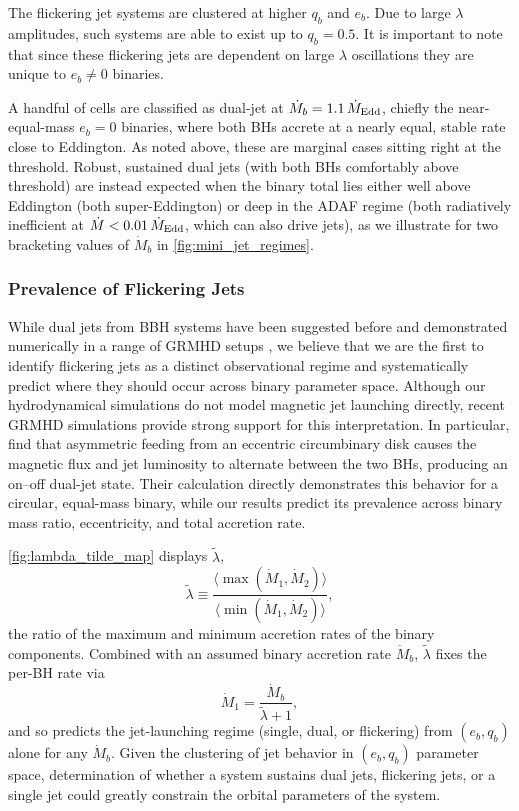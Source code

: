 \documentclass[fleqn,usenatbib]{mnras}
\begin{document}
The flickering jet systems are clustered at higher $q_b$ and $e_b$. Due to large $\lambda$ amplitudes, such systems are able to exist up to $q_b=0.5$. It is important to note that since these flickering jets are dependent on large $\lambda$ oscillations they are unique to $e_b \neq 0$ binaries.

A handful of cells are classified as dual-jet at $\dot{M}_b = 1.1\,\dot{M}_{\rm Edd}$, chiefly the near-equal-mass $e_b = 0$ binaries, where both BHs accrete at a nearly equal, stable rate close to Eddington. As noted above, these are marginal cases sitting right at the threshold. Robust, sustained dual jets (with both BHs comfortably above threshold) are instead expected when the binary total lies either well above Eddington (both super-Eddington) or deep in the ADAF regime (both radiatively inefficient at $\dot{M} < 0.01\,\dot{M}_{\rm Edd}$, which can also drive jets), as we illustrate for two bracketing values of $\dot{M}_b$ in \autoref{fig:mini_jet_regimes}.

\subsubsection{Prevalence of Flickering Jets}\label{sec:prev_flicker}
While dual jets from BBH systems have been suggested before \citep{Palenzuela_dualjet_10,BaumgarteShapiro2011,Qian_dualjet_19} and demonstrated numerically in a range of GRMHD setups \citep{Gold_2014_jets, Gutierrez_24, Ressler_dualjet_25, Ruiz_Shapiro_23, Most_Wang_24, Ennoggi_25}, we believe that we are the first to identify flickering jets as a distinct observational regime and systematically predict where they should occur across binary parameter space. Although our hydrodynamical simulations do not model magnetic jet launching directly, recent GRMHD simulations provide strong support for this interpretation. In particular, \citet{combi2026dualjets} find that asymmetric feeding from an eccentric circumbinary disk causes the magnetic flux and jet luminosity to alternate between the two BHs, producing an on--off dual-jet state. Their calculation directly demonstrates this behavior for a circular, equal-mass binary, while our results predict its prevalence across binary mass ratio, eccentricity, and total accretion rate.

\autoref{fig:lambda_tilde_map} displays $\tilde{\lambda}$,
\begin{equation}
    \tilde{\lambda} \equiv \frac{\langle \max (\dot{M}_{1}, \dot{M}_{2}) \rangle }{\langle \min (\dot{M}_{1}, \dot{M}_{2}) \rangle},
\end{equation}
the ratio of the maximum and minimum accretion rates of the binary components. Combined with an assumed binary accretion rate $\dot{M}_b$, $\tilde{\lambda}$ fixes the per-BH rate via
\begin{equation}
    \dot{M}_1 = \frac{\dot{M}_b}{\tilde{\lambda} + 1},
\end{equation}
and so predicts the jet-launching regime (single, dual, or flickering) from $(e_b, q_b)$ alone for any $\dot{M}_b$. Given the clustering of jet behavior in $(e_b, q_b)$ parameter space, determination of whether a system sustains dual jets, flickering jets, or a single jet could greatly constrain the orbital parameters of the system.
\end{document}
